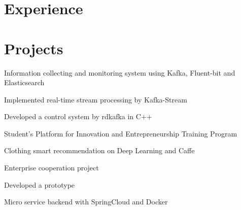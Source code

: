 \documentclass[]{deedy-resume-openfont}
\begin{document}
\begin{minipage}[t]{0.68\textwidth} 


\section{Experience}
\sectionsep


\sectionsep


\section{Projects}
\sectionsep

\vspace{\topsep}
\begin{tightemize}
    \item Information collecting and monitoring system using Kafka, Fluent-bit and Elasticsearch
    \item Implemented real-time stream processing by Kafka-Stream
    \item Developed a control system by rdkafka in C++
\end{tightemize}
\sectionsep

\begin{tightemize}
    \item Student's Platform for Innovation and Entrepreneurship Training Program
    \item Clothing smart recommendation on Deep Learning and Caffe
\end{tightemize}

\sectionsep

\begin{tightemize}
    \item Enterprise cooperation project
    \item Developed a prototype
    \item Micro service backend with SpringCloud and Docker
\end{tightemize}

\sectionsep


\end{minipage}
\end{document}

